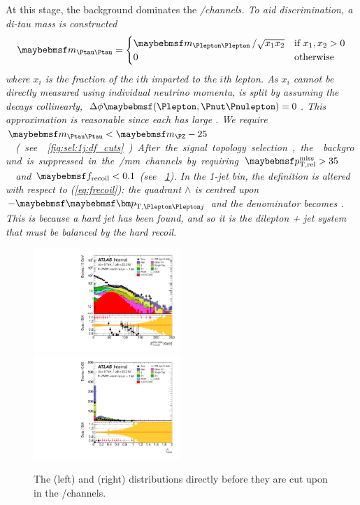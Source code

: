 At this stage, the \DYtt background dominates the \em/\me channels. To aid 
discrimination, a di-tau mass is constructed
\begin{equation}
	\mtautau = 
		\begin{cases}
			\mll \,/ \sqrt{x_1 x_2} &\text{if}~x_1, x_2 > 0 \\
			0 &\text{otherwise}
		\end{cases}
\end{equation}
where $x_i$ is the \pt fraction of the $i$th \Ptau imparted to the $i$th lepton. As $x_i$ 
cannot be directly measured using individual neutrino momenta, \corrtrackmet is split by 
assuming the \Ptau decays collinearly, \ie 
$\Delta\phi\parenths{\Plepton,\HepProcess{\Pnut\Pnulepton}} = 0$. 
This approximation is reasonable since each \Ptau has large \pt. We require 
\unit{$\mtautau < \mZ - 25$}{\GeV} (see \Figure~\ref{fig:sel:1j:df_cuts}).

After the signal topology selection, the \DYll background is suppressed in the \ee/\mm 
channels by requiring \unit{$\trackmetrel > 35$}{\GeV} and $\frecoil < 0.1$ (see 
\Figure~\ref{fig:sel:1j:sf_cuts}). In the 1-jet bin, the \frecoil definition is altered 
with respect to (\ref{eq:frecoil}): the quadrant $\wedge$ is centred upon $-\ptlljvec$ 
and the denominator becomes \ptllj. This is because a hard jet has been found, and so it 
is the dilepton + jet system that must be balanced by the hard recoil.

\begin{figure}
	\includegraphics[width=0.495\textwidth]{tex/selection/eemm_CutTopoMll_1jet_METRel_TrackHWW_Clj_mh125_log}
	\hfill
	\includegraphics[width=0.495\textwidth]{tex/selection/eemm_CutTopoDPhill_1jet_f_recoil_ext_mh125_lin}
	\caption{The \corrtrackmetrel (left) and \frecoil (right) distributions directly 
	before they are cut upon in the \ee/\mm channels.}
	\label{fig:sel:1j:sf_cuts}
\end{figure}

